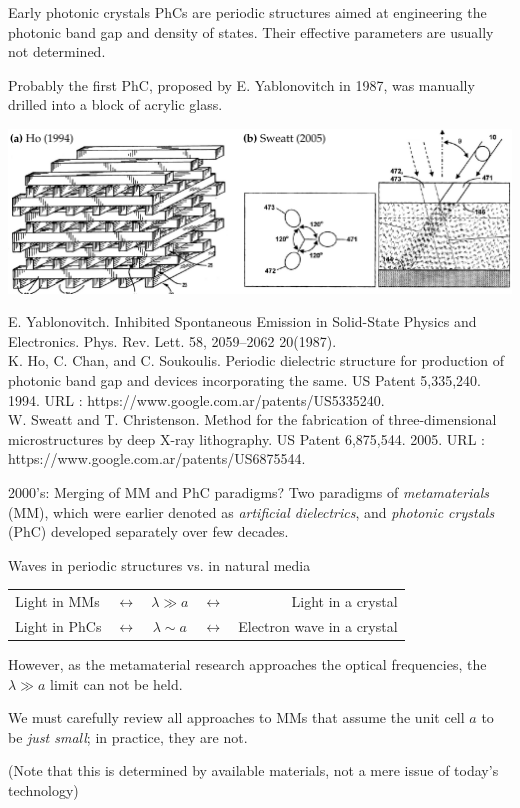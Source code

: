\documentclass[t]{beamer} \usepackage[english]{babel} \usepackage[utf8]{inputenc} \usetheme{Frankfurt} %
\begin{document}
	\begin{frame}{Early photonic crystals} 		%
PhCs are periodic structures aimed at engineering the photonic band gap and density of states. 
Their effective parameters are usually not determined.

Probably the first PhC, proposed by E. Yablonovitch in 1987, was manually drilled into a block of acrylic glass.

\vfill
\includegraphics[width=\textwidth]{../img/patents/phc_patents.pdf} 
\vfill

\tiny{E. Yablonovitch. Inhibited Spontaneous Emission in Solid-State Physics and Electronics. Phys. Rev. Lett. 58, 2059–2062 20(1987).\\
K. Ho, C. Chan, and C. Soukoulis. Periodic dielectric structure for production of photonic band gap and devices incorporating the same. US Patent 5,335,240. 1994.  URL : https://www.google.com.ar/patents/US5335240.\\
W. Sweatt and T. Christenson. Method for the fabrication of three-dimensional microstructures by deep X-ray lithography. US Patent 6,875,544. 2005. URL : https://www.google.com.ar/patents/US6875544.  }
\end{frame} 		%

\begin{frame}{2000's: Merging of MM and PhC paradigms?} 		%
Two paradigms of \textit{metamaterials} (MM), which were earlier denoted as \textit{artificial dielectrics}, and \textit{photonic crystals} (PhC) developed separately over few decades.

\begin{exampleblock}{Waves in periodic structures vs. in natural media}
\centering \begin{tabular}{lcccr}
Light in MMs    &$\leftrightarrow$  &$\lambda \gg a$ &$\leftrightarrow$ 	& Light in a crystal         	\\
Light in PhCs   &$\leftrightarrow$  &$\lambda \sim a$ &$\leftrightarrow$ 	& Electron wave in a crystal 	\\
\end{tabular}
\end{exampleblock}

However, as the metamaterial research approaches the optical frequencies,  the $\lambda \gg a$ limit can not be held.
\vspace{.5em}

We must carefully review all approaches to MMs that assume the unit cell $a$ to be \textit{just small}; in practice, they are not.
\vspace{.5em}

(Note that this is determined by available materials, not a mere issue of today's technology)

\end{frame} 		%
\end{document}
